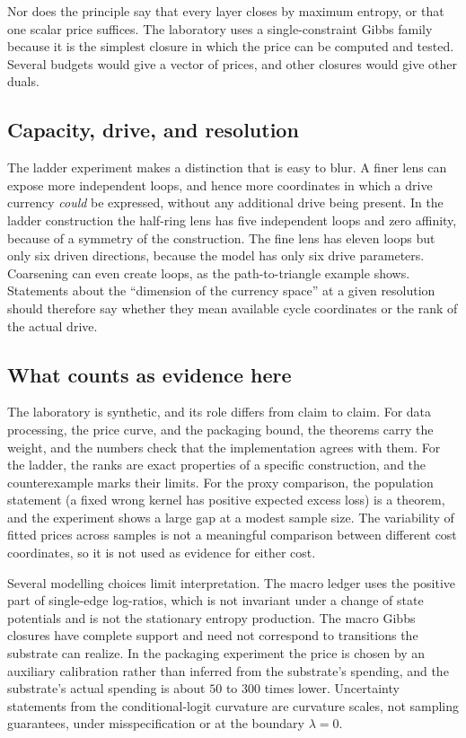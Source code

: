 Nor does the principle say that every layer closes by maximum entropy, or that one scalar price suffices. The laboratory uses a single-constraint Gibbs family because it is the simplest closure in which the price can be computed and tested. Several budgets would give a vector of prices, and other closures would give other duals.

\subsection{Capacity, drive, and resolution}

The ladder experiment makes a distinction that is easy to blur. A finer lens can expose more independent loops, and hence more coordinates in which a drive currency \emph{could} be expressed, without any additional drive being present. In the ladder construction the half-ring lens has five independent loops and zero affinity, because of a symmetry of the construction. The fine lens has eleven loops but only six driven directions, because the model has only six drive parameters. Coarsening can even create loops, as the path-to-triangle example shows. Statements about the ``dimension of the currency space'' at a given resolution should therefore say whether they mean available cycle coordinates or the rank of the actual drive.

\subsection{What counts as evidence here}

The laboratory is synthetic, and its role differs from claim to claim. For data processing, the price curve, and the packaging bound, the theorems carry the weight, and the numbers check that the implementation agrees with them. For the ladder, the ranks are exact properties of a specific construction, and the counterexample marks their limits. For the proxy comparison, the population statement (a fixed wrong kernel has positive expected excess loss) is a theorem, and the experiment shows a large gap at a modest sample size. The variability of fitted prices across samples is not a meaningful comparison between different cost coordinates, so it is not used as evidence for either cost.

Several modelling choices limit interpretation. The macro ledger uses the positive part of single-edge log-ratios, which is not invariant under a change of state potentials and is not the stationary entropy production. The macro Gibbs closures have complete support and need not correspond to transitions the substrate can realize. In the packaging experiment the price is chosen by an auxiliary calibration rather than inferred from the substrate's spending, and the substrate's actual spending is about \(50\) to \(300\) times lower. Uncertainty statements from the conditional-logit curvature are curvature scales, not sampling guarantees, under misspecification or at the boundary \(\lambda=0\).


